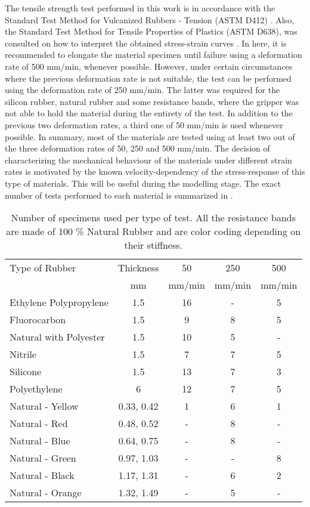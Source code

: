 The tensile strength test performed in this work is in accordance with the Standard Test Method for Vulcanized Rubbers - Tension (ASTM D412) \cite{astmd412}. Also, the Standard Test Method for Tensile Properties of Plastics (ASTM D638), was consulted on how to interpret the obtained stress-strain curves \cite{astmd638}. In here, it is recommended to elongate the material specimen until failure using a deformation rate of 500 mm/min, whenever possible. However, under certain circumstances where the previous deformation rate is not suitable, the test can be performed using the deformation rate of 250 mm/min. The latter was required for the silicon rubber, natural rubber and some resistance bands, where the gripper was not able to hold the material during the entirety of the test. In addition to the previous two deformation rates, a third one of 50 mm/min is used whenever possible. In summary, most of the materials are tested using at least two out of the three deformation rates of 50, 250 and 500 mm/min. The decision of characterizing the mechanical behaviour of the materials under different strain rates is motivated by the known velocity-dependency of the stress-response of this type of materials. This will be useful during the modelling stage. The exact number of tests performed to each material is summarized in .

\begin{table}[htb!]
    \centering
    \caption{Number of specimens used per type of test. All the resistance bands are made of 100 \% Natural Rubber and are color coding depending on their stiffness.}
    \begin{tabular}{lcccc}
    \toprule
    Type of Rubber & Thickness &  50 & 250 & 500\\
     & mm & mm/min & mm/min & mm/min \\
    \hline
    Ethylene Polypropylene   &  1.5 & 16 & - & 5\\
    Fluorocarbon              &  1.5 & 9 & 8 & 5\\
    Natural with Polyester   &  1.5 & 10 & 5 & -\\
    Nitrile                   &  1.5 & 7 & 7 & 5\\
    Silicone                  &  1.5 & 13 & 7 & 3\\
    Polyethylene              &  6 & 12 & 7 & 5\\
    \hline
    Natural - Yellow  & 0.33, 0.42 & 1 & 6 & 1\\
    Natural - Red  & 0.48, 0.52 & - & 8 & -\\
    Natural - Blue  & 0.64, 0.75 & - & 8 & -\\
    Natural - Green  & 0.97, 1.03 & - & - & 8\\
    Natural - Black  & 1.17, 1.31 & - & 6 & 2\\
    Natural - Orange  & 1.32, 1.49 & - & 5 & -\\
    \bottomrule
    \end{tabular}
    \label{tbl:tensile_tests}
\end{table}

